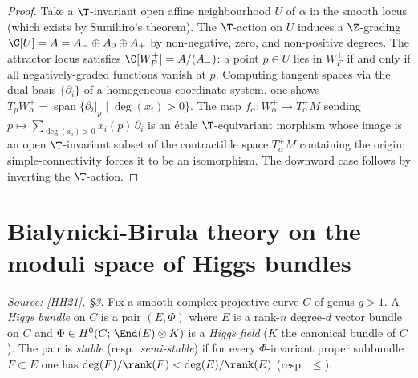 \begin{proof}
  Take a \(\T\)-invariant open affine neighbourhood \(U\) of \(\alpha\) in the smooth locus
  (which exists by Sumihiro's theorem).  The \(\T\)-action on \(U\) induces a \(\Z\)-grading
  \(\C[U] = A = A_- \oplus A_0 \oplus A_+\) by non-negative, zero, and non-positive degrees.
  The attractor locus satisfies \(\C[W^+_F] = A/(A_-)\): a point \(p \in U\) lies in
  \(W^+_F\) if and only if all negatively-graded functions vanish at \(p\).  Computing tangent
  spaces via the dual basis \(\{\partial_i\}\) of a homogeneous coordinate system, one shows
  \(T_p W^+_\alpha = \operatorname{span}\{\partial_i|_p \mid \deg(x_i) > 0\}\).
  The map \(f_\alpha : W^+_\alpha \to T^+_\alpha M\) sending \(p \mapsto \sum_{\deg(x_i)>0} x_i(p)\,\partial_i\)
  is an étale \(\T\)-equivariant morphism whose image is an open \(\T\)-invariant subset of the
  contractible space \(T^+_\alpha M\) containing the origin; simple-connectivity forces it to be
  an isomorphism.  The downward case follows by inverting the \(\T\)-action.
\end{proof}

\section{Bialynicki-Birula theory on the moduli space of Higgs bundles}

\begin{definition}
  \label{def:Higgs_bundle}
  \uses{}
  \textit{Source: [HH21], §3.}
  Fix a smooth complex projective curve \(C\) of genus \(g > 1\).  A \emph{Higgs bundle} on
  \(C\) is a pair \((E, \Phi)\) where \(E\) is a rank-\(n\) degree-\(d\) vector bundle on \(C\)
  and \(\Phi \in H^0(C;\, \End(E) \otimes K)\) is a \emph{Higgs field} (\(K\) the canonical
  bundle of \(C\)).  The pair is \emph{stable} (resp.\ \emph{semi-stable}) if for every
  \(\Phi\)-invariant proper subbundle \(F \subset E\) one has
  \(\deg(F)/\rank(F) < \deg(E)/\rank(E)\) (resp.\ \(\leq\)).
\end{definition}

